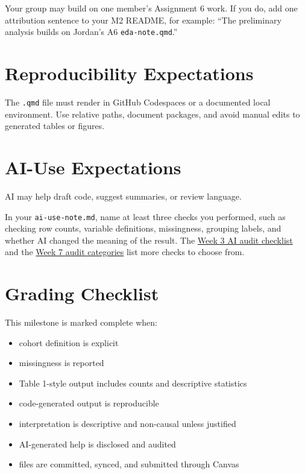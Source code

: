 \documentclass[
  letterpaper,
  DIV=11,
  numbers=noendperiod,
  oneside]{scrreprt}
\providecommand{\tightlist}{%
  \setlength{\itemsep}{0pt}\setlength{\parskip}{0pt}}
\begin{document}
Your group may build on one member's Assignment 6 work. If you do, add
one attribution sentence to your M2 README, for example: ``The
preliminary analysis builds on Jordan's A6 \texttt{eda-note.qmd}.''

\section{Reproducibility
Expectations}\label{reproducibility-expectations-4}

The \texttt{.qmd} file must render in GitHub Codespaces or a documented
local environment. Use relative paths, document packages, and avoid
manual edits to generated tables or figures.

\section{AI-Use Expectations}\label{ai-use-expectations-13}

AI may help draft code, suggest summaries, or review language.

In your \texttt{ai-use-note.md}, name at least three checks you
performed, such as checking row counts, variable definitions,
missingness, grouping labels, and whether AI changed the meaning of the
result. The \hyperref[ai-safety-the-audit-checklist-1]{Week 3 AI audit
checklist} and the
\hyperref[four-audit-categories-for-ai-drafted-eda]{Week 7 audit
categories} list more checks to choose from.

\section{Grading Checklist}\label{grading-checklist-12}

This milestone is marked complete when:

\begin{itemize}
\tightlist
\item
  cohort definition is explicit
\item
  missingness is reported
\item
  Table 1-style output includes counts and descriptive statistics
\item
  code-generated output is reproducible
\item
  interpretation is descriptive and non-causal unless justified
\item
  AI-generated help is disclosed and audited
\item
  files are committed, synced, and submitted through Canvas
\end{itemize}
\end{document}
